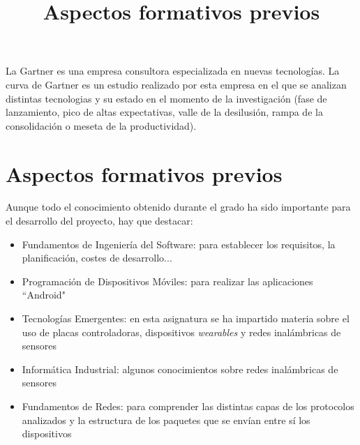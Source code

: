 La Gartner es una empresa consultora especializada en nuevas tecnologías. La curva de Gartner es
un estudio realizado por esta empresa en el que se analizan distintas tecnologias
y su estado en el momento de la investigación (fase de lanzamiento, pico
de altas expectativas, valle de la desilusión, rampa de la consolidación o meseta
de la productividad).\\

\title{Aspectos formativos previos}
\section{Aspectos formativos previos}

Aunque todo el conocimiento obtenido durante el grado ha sido importante para el desarrollo del proyecto, hay que destacar:
  \begin{itemize}
    \item Fundamentos de Ingeniería del Software: para establecer los requisitos,
    la planificación, costes de desarrollo...
    \item Programación de Dispositivos Móviles: para realizar las aplicaciones ``Android"
    \item Tecnologías Emergentes: en esta asignatura se ha impartido materia sobre el uso
    de placas controladoras, dispositivos \textit{wearables} y redes inalámbricas de sensores
    \item Informática Industrial: algunos conocimientos sobre redes inalámbricas de sensores
    \item Fundamentos de Redes: para comprender las distintas capas de los protocolos analizados y
    la estructura de los paquetes que se envían entre sí los dispositivos
  \end{itemize}
